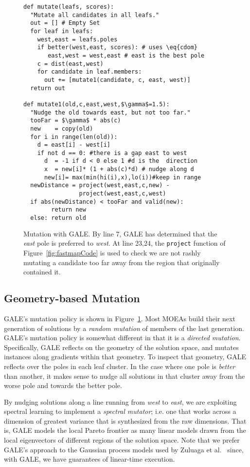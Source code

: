 \documentclass[10pt,journal,compsoc]{IEEEtran}
\newcommand{\eq}[1]{Equation~\ref{eq:#1}}
\newcommand{\fig}[1]{Figure~\ref{fig:#1}}
\begin{document}
\begin{figure}[!b]
\begin{lstlisting}[mathescape,frame=r,numbers=right]
def mutate(leafs, scores): 
  "Mutate all candidates in all leafs."
  out = [] # Empty Set
  for leaf in leafs:
    west,east = leafs.poles
    if better(west,east, scores): # uses \eq{cdom}
       east,west = west,east # east is the best pole
    c = dist(east,west)
    for candidate in leaf.members:
      out += [mutate1(candidate, c, east, west)]
  return out 

def mutate1(old,c,east,west,$\gamma$=1.5): 
  "Nudge the old towards east, but not too far."
  tooFar = $\gamma$ * abs(c)
  new    = copy(old)
  for i in range(len(old)):
    d = east[i] - west[i]
    if not d == 0: #there is a gap east to west
      d  = -1 if d < 0 else 1 #d is the  direction
      x  = new[i]* (1 + abs(c)*d) # nudge along d 
      new[i]= max(min(hi(i),x),lo(i))#keep in range
  newDistance = project(west,east,c,new) -
                project(west,east,c,west)
  if abs(newDistance) < tooFar and valid(new): 
        return new
  else: return old
\end{lstlisting}

\caption{Mutation with GALE.
By line 7, GALE has determined that the {\em east}
pole is preferred  to {\em west}.
At line 23,24, the {\tt project}
function of \fig{fastmapCode}  is used
to check 
we are not rashly mutating a candidate too far away from
the region that originally contained it.}
\label{fig:mutantCode}   
\end{figure}
\subsection{Geometry-based Mutation}
GALE's mutation policy is shown in \fig{mutantCode}.
Most MOEAs build their next generation of solutions
by a {\em random mutation} of members of the last
generation. GALE's mutation policy is somewhat
different in that it is a {\em directed mutation}.
Specifically, GALE reflects on the geometry of the
solution space, and mutates instances along
gradients within that geometry. 
To inspect that geometry, GALE reflects over the poles
in each leaf cluster. In the case where one pole
is {\em better} than another, it makes sense to
nudge all solutions in that cluster away from the
worse pole and towards the better pole.  



By nudging solutions along a line
running from {\em west} to {\em east}, we are
exploiting spectral learning to implement a {\em
spectral mutator}; i.e. one that works across a
dimension of greatest variance that is synthesized
from the raw dimensions.  That is, GALE models the
local Pareto frontier as many linear models
drawn from the local eigenvectors of different
regions of the solution space.  Note that we prefer
GALE's approach to the Gaussian process models used
by Zuluaga et al.~\cite{Zuluaga:13} since, with GALE, we have
guarantees of linear-time execution.
\end{document}

